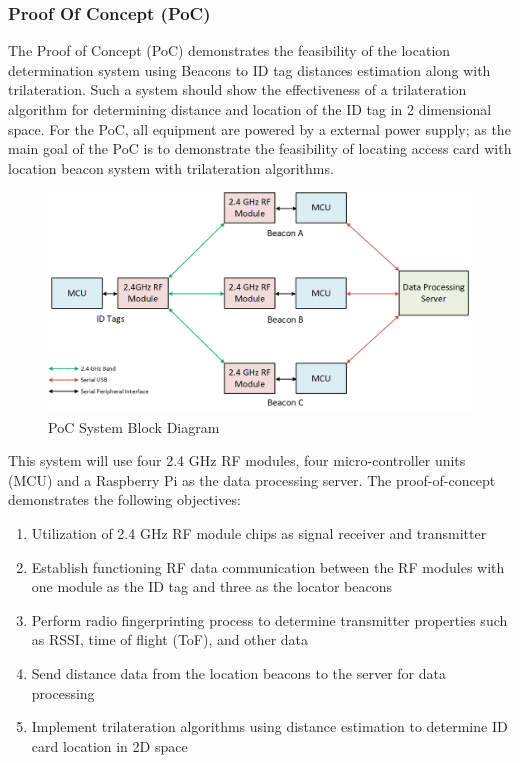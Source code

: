 \break
\subsubsection{Proof Of Concept (PoC)}
The Proof of Concept (\Gls{PoC}) demonstrates the feasibility of the location determination system using Beacons to ID tag distances estimation along with trilateration. Such a system should show the effectiveness of a trilateration algorithm for determining distance and location of the ID tag in 2 dimensional space. For the PoC, all equipment are powered by a external power supply; as the main goal of the PoC is to demonstrate the feasibility of locating access card with location beacon system with trilateration algorithms.

\begin{figure}[h!]
    \centering
    \includegraphics[width=\linewidth]{./images/01_sys_PoC.png}
    \caption{PoC System Block Diagram}
    \label{fig:PoC_sys_blk}
\end{figure}
\bigskip

This system will use four 2.4 GHz \Gls{RF} modules, four micro-controller units (\Gls{MCU}) and a Raspberry Pi as the data processing server. The proof-of-concept demonstrates the following objectives:

\begin{enumerate}
    \item Utilization of 2.4 GHz RF module chips as signal receiver and transmitter
    \item Establish functioning RF data communication between the RF modules with one module as the ID tag and three as the locator beacons
    \item Perform radio fingerprinting process to determine transmitter properties such as RSSI, time of flight (\Gls{ToF}), and other data
    \item Send distance data from the location beacons to the server for data processing
    \item Implement trilateration algorithms using distance estimation to determine ID card location in 2D space
\end{enumerate}

